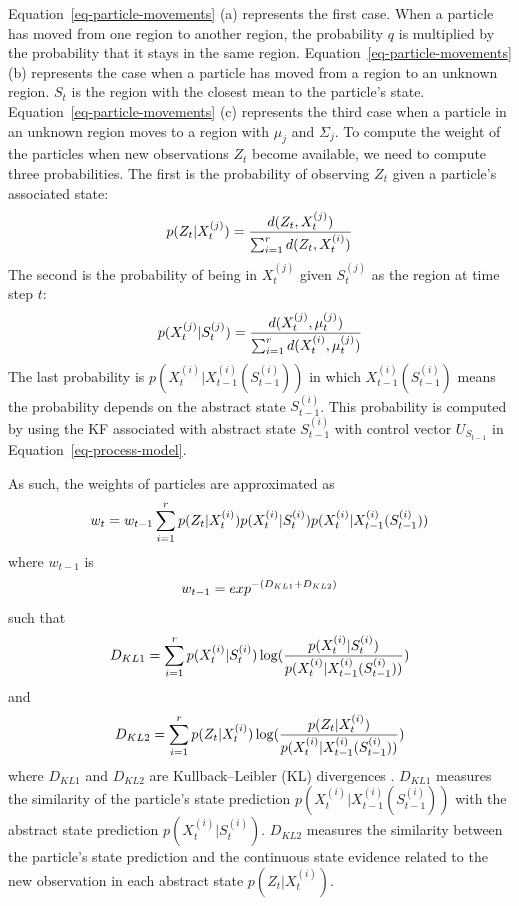 \documentclass[runningheads]{llncs}
\begin{document}
Equation~\ref{eq-particle-movements} (a) represents the first case. When a particle has moved from one region to another region, the probability $q$ is multiplied by the probability that it stays in the same region. Equation~\ref{eq-particle-movements} (b) represents the case when a particle has moved from a region to an unknown region. $S_t$ is the region with the closest mean to the particle's state. Equation~\ref{eq-particle-movements} (c) represents the third case when a particle in an unknown region moves to a region with $\mu_j$ and $\Sigma_j$. To compute the weight of the particles when new observations $Z_t$ become available, we need to compute three probabilities. The first is the probability of observing $Z_t$ given a particle's associated state:
    \begin{equation}
        \small
        p(Z_t|X_{t}^{(j)}) = \frac{d(Z_t,X_{t}^{(j)})}{\sum_{i=1}^{r}d(Z_t,X_{t}^{(i)})}
    \end{equation}
    The second is the probability of being in $X_{t}^{(j)}$ given $S_{t}^{(j)}$ as the region at time step $t$:
    \begin{equation}
        \small
        p(X_{t}^{(j)}|S_{t}^{(j)}) = \frac{d(X_{t}^{(j)},\mu_{t}^{(j)})}{\sum_{i=1}^{r}d(X_{t}^{(i)},\mu_{t}^{(j)})}
    \end{equation} 
    The last probability is $p(X_t^{(i)}|X_{t-1}^{(i)}(S_{t-1}^{(i)}))$ in which $X_{t-1}^{(i)}(S_{t-1}^{(i)})$ means the probability depends on the abstract state $S_{t-1}^{(i)}$. This probability is computed by using the KF associated with abstract state $S_{t-1}^{(i)}$ with control vector $U_{S_{t-1}}$ in Equation~\ref{eq-process-model}.  
    
    As such, the weights of particles are approximated as 
    \begin{equation}
        \small
        w_t = w_{t-1}\sum_{i=1}^{r} p(Z_t|X_t^{(i)})p(X_t^{(i)}|S_t^{(i)})p(X_t^{(i)}|X_{t-1}^{(i)}(S_{t-1}^{(i)}))
    \end{equation}
    where $w_{t-1}$ is 
    \begin{equation}
        \small
       w_{t-1} = exp^{-(D_{KL1}+D_{KL2})}
    \end{equation}
    such that
    \begin{equation}
        \small
        D_{KL1}=\sum_{i=1}^{r} p(X_t^{(i)}|S_t^{(i)})\log(\frac{p(X_t^{(i)}|S_t^{(i)})}{p(X_t^{(i)}|X_{t-1}^{(i)}(S_{t-1}^{(i)}))})
        \label{eq-kl-1}
    \end{equation}
    and
    \begin{equation}
        \small
        D_{KL2}=\sum_{i=1}^{r} p(Z_t|X_t^{(i)})\log(\frac{p(Z_t|X_t^{(i)})}{p(X_t^{(i)}|X_{t-1}^{(i)}(S_{t-1}^{(i)}))})
        \label{eq-kl-2}
    \end{equation}
    where $D_{KL1}$ and $D_{KL2}$ are Kullback–Leibler (KL) divergences \cite{joyce-2011-kullback-leibler-divergence}.
    $D_{KL1}$ measures the similarity of the particle's state prediction $p(X^{(i)}_{t}|X^{(i)}_{t-1}(S^{(i)}_{t-1}))$ with the abstract state prediction $p(X_{t}^{(i)}|S_{t}^{(i)})$. $D_{KL2}$ measures the similarity between the particle's state prediction and the continuous state evidence related to the new observation in each abstract state $p(Z_t|X_t^{(i)})$. 
    
\end{document}
